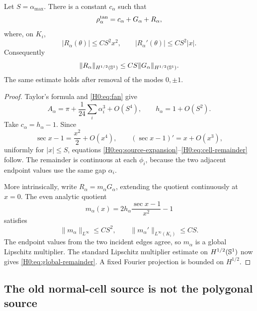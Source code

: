 \begin{lemma}\label{H0:lem:source-expansion}
Let $S=\alpha_{\max}$.  There is a constant $c_\alpha$ such that
\begin{equation}\label{H0:eq:source-expansion}
 \rho_\alpha^{\rm tan}=c_\alpha+G_\alpha+R_\alpha,
\end{equation}
where, on $K_i$,
\begin{equation}\label{H0:eq:cell-remainder}
 |R_\alpha(\theta)|\le CS^2x^2,
 \qquad |R_\alpha'(\theta)|\le CS^2|x|.
\end{equation}
Consequently
\begin{equation}\label{H0:eq:global-remainder}
 \|R_\alpha\|_{H^{1/2}(\mathbb S^1)}
 \le CS\|G_\alpha\|_{H^{1/2}(\mathbb S^1)}.
\end{equation}
The same estimate holds after removal of the modes $0,\pm1$.
\end{lemma}

\begin{proof}
Taylor's formula and \eqref{H0:eq:fan} give
\begin{equation}
 A_\alpha
 =\pi+\frac1{24}\sum_i\alpha_i^3+O(S^4),
 \qquad h_\alpha=1+O(S^2).
\end{equation}
Take $c_\alpha=h_\alpha-1$.  Since
\begin{equation}
 \sec x-1=\frac{x^2}{2}+O(x^4),
 \qquad (\sec x-1)'=x+O(x^3),
\end{equation}
uniformly for $|x|\le S$, equations
\eqref{H0:eq:source-expansion}--\eqref{H0:eq:cell-remainder} follow.  The
remainder is continuous at each $\phi_i$, because the two adjacent endpoint
values use the same gap $\alpha_i$.

More intrinsically, write $R_\alpha=m_\alpha G_\alpha$, extending the
quotient continuously at $x=0$.  The even analytic quotient
\begin{equation}
 m_\alpha(x)=2h_\alpha\frac{\sec x-1}{x^2}-1
\end{equation}
satisfies
\begin{equation}
 \|m_\alpha\|_{L^\infty}\le CS^2,
 \qquad \|m_\alpha'\|_{L^\infty(K_i)}\le CS.
\end{equation}
The endpoint values from the two incident edges agree, so $m_\alpha$ is a
global Lipschitz multiplier.  The standard Lipschitz multiplier estimate on
$H^{1/2}(\mathbb S^1)$ now gives \eqref{H0:eq:global-remainder}.  A fixed Fourier
projection is bounded on $H^{1/2}$.
\end{proof}

\subsection{The old normal-cell source is not the polygonal source}

